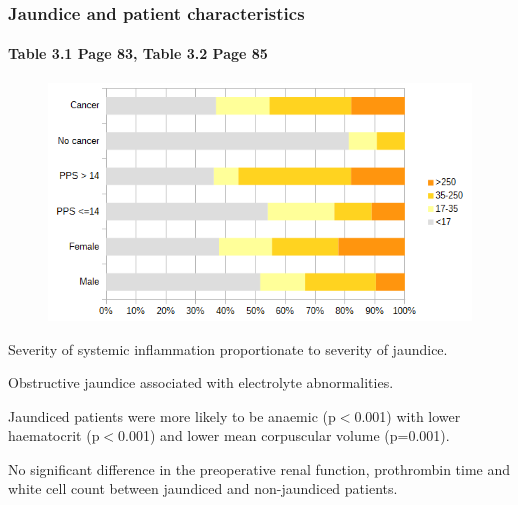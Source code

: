 \documentclass{beamer}
\begin{document}
\begin{frame}
	\frametitle{Jaundice and patient characteristics}
	\framesubtitle{Table 3.1 Page 83, Table 3.2 Page 85 }
	\begin{figure}
		\includegraphics[height=0.4\textheight]{jaundice_vs_patient_factors}
	\end{figure}
	{\scriptsize			
	Severity of systemic inflammation proportionate to severity of jaundice. \\
	\medskip
	
	Obstructive jaundice associated with electrolyte abnormalities.\\
	\medskip			
	
	Jaundiced patients were more likely to be anaemic (p$<$0.001) with lower haematocrit (p$<$0.001) and lower mean corpuscular volume (p=0.001).\\
	\medskip
	
	No significant difference in the preoperative renal function, prothrombin time and white cell count between jaundiced and non-jaundiced patients.\\
	}
\end{frame}
\end{document}
